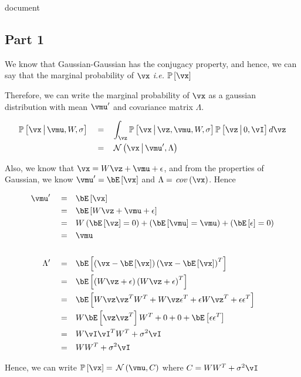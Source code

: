 document\documentclass{article}
\begin{document}
\setlength\parindent{0pt}


\begin{mlsolution}

	\subsection*{Part 1}
	\begin{addmargin}{1.5em}

		We know that Gaussian-Gaussian has the conjugacy property, and hence, we can say that the marginal probability of $\vx$ \textit{i.e.} $\prob{\vx}$ \br%

		Therefore, we can write the marginal probability of $\vx$ as a gaussian distribution with mean $\pr{\vmu}$ and covariance matrix $\Lambda$.

		\begin{align*}
			\prob{\vx \pipe \vmu, W, \sigma}	\eq&	\int_{\vz} \prob{\vx \pipe \vz, \vmu, W, \sigma} \prob{\vz \pipe 0, \iden} d\vz \\
												\eq&	\ND{\vx \pipe \pr{\vmu}, \Lambda}
		\end{align*}

		Also, we know that $\vx = W\vz + \vmu + \eps$, and from the properties of Gaussian, we know $\pr{\vmu} = \E{\vx}$ and $\Lambda = \func{cov}{\vx}$. Hence

		\begin{align*}
			\pr{\vmu}		\eq&	\E{\vx} \\
							\eq&	\E{W\vz + \vmu + \eps} \\
							\eq&	W\para{\E{\vz} = 0} + \para{\E{\vmu} = \vmu} + \para{\E{\eps} = 0} \\
							\eq&	\vmu \\
			\\
			\pr{\Lambda}	\eq&	\E{\para{\vx - \E{\vx}} \para{\vx - \E{\vx}}^T} \\
							\eq&	\E{\para{W \vz + \eps} \para{W \vz + \eps}^T} \\
							\eq&	\E{W \vz \vz^T W^T + W \vz \eps^T + \eps W \vz^T + \eps \eps^T} \\
							\eq&	W \E{\vz \vz^T} W^T + 0 + 0 + \E{\eps \eps^T} \\
							\eq&	W \iden \iden^T W^T + \sigma^2 \iden \\
							\eq&	W W^T + \sigma^2 \iden
		\end{align*}

		Hence, we can write $\prob{\vx} = \ND{\vmu, C}$ where $C = W W^T + \sigma^2 \iden$


\end{addmargin}
\end{mlsolution}
\end{document}
